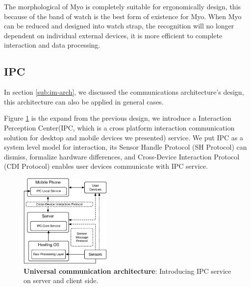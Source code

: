 The morphological of Myo is completely suitable for ergonomically design, this because of the band of watch is the best form of existence for Myo. When Myo can be reduced and designed into watch strap, the recognition will no longer dependent on individual external devices, it is more efficient to complete interaction and data processing.

\subsection{IPC}

In section \ref{sub:im-arch}, we discussed the communications architecture's design, this architecture can also be applied in general cases.

Figure \ref{fig:universe-arch} is the expand from the previous design, we introduce a Interaction Perception Center(IPC, which is a cross platform interaction communication solution for desktop and mobile devices we presented) service\cite{Changkun:2015ipc}. We put IPC as a system level model for interaction, its Sensor Handle Protocol (SH Protocol) can dismiss, formalize hardware differences, and Cross-Device Interaction Protocol (CDI Protocol) enables user devices communicate with IPC service.

\begin{figure}[H]
    \kaishu
    \centering
    \includegraphics[width=0.4\textwidth]{figures/universe-arch}
    \caption{\kaishu \textbf{Universal communication architecture}: Introducing IPC service on server and client side.}
    \label{fig:universe-arch}
\end{figure}

